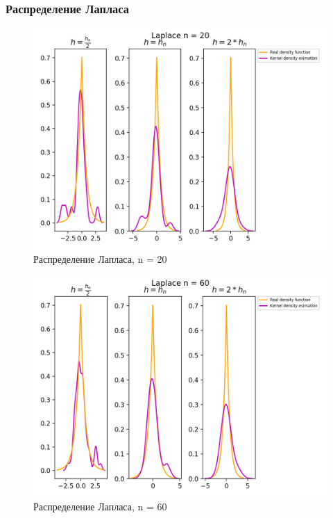 \subsubsection{Распределение Лапласа}
\begin{figure}[H]
	\begin{center}
		\includegraphics[scale=0.7]{fig/Laplace20_kde.png}
		\caption{Распределение Лапласа, n = 20} 
		\label{pic:pic_name}
	\end{center}
\end{figure}

\begin{figure}[H]
	\begin{center}
		\includegraphics[scale=0.7]{fig/Laplace60_kde.png}
		\caption{Распределение Лапласа, n = 60} 
		\label{pic:pic_name}
	\end{center}
\end{figure}

